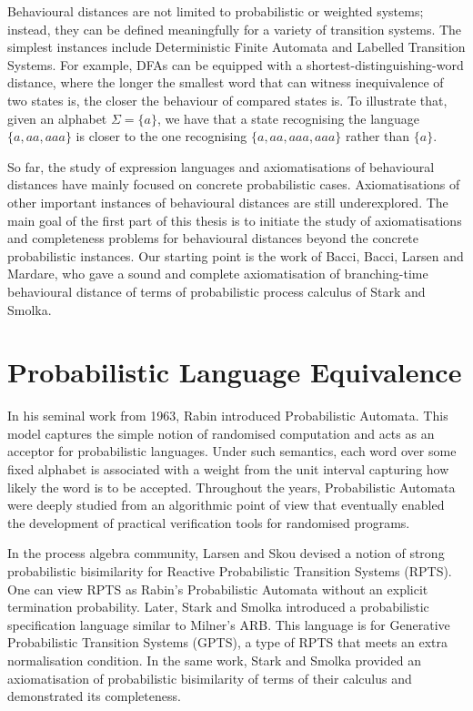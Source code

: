 Behavioural distances are not limited to probabilistic or weighted systems; instead, they can be defined meaningfully for a variety of transition systems. The simplest instances include Deterministic Finite Automata and Labelled Transition Systems. For example, DFAs can be equipped with a shortest-distinguishing-word distance, where the longer the smallest word that can witness inequivalence of two states is, the closer the behaviour of compared states is. To illustrate that, given an alphabet $\Sigma = \{a\}$, we have that a state recognising the language $\{a,aa, aaa\}$ is closer to the one recognising $\{a,aa,aaa,aaa\}$ rather than $\{a\}$. 

So far, the study of expression languages and axiomatisations of behavioural distances have mainly focused on concrete probabilistic cases. Axiomatisations of other important instances of behavioural distances are still underexplored. The main goal of the first part of this thesis is to initiate the study of axiomatisations and completeness problems for behavioural distances beyond the concrete probabilistic instances. Our starting point is the work of Bacci, Bacci, Larsen and Mardare, who gave a sound and complete axiomatisation of branching-time behavioural distance of terms of probabilistic process calculus of Stark and Smolka.

\section{Probabilistic Language Equivalence}
In his seminal work from 1963, Rabin introduced Probabilistic Automata. This model captures the simple notion of randomised computation and acts as an acceptor for probabilistic languages. Under such semantics, each word over some fixed alphabet is associated with a weight from the unit interval capturing how likely the word is to be accepted. Throughout the years, Probabilistic Automata were deeply studied from an algorithmic point of view that eventually enabled the development of practical verification tools for randomised programs. 

In the process algebra community, Larsen and Skou devised a notion of strong probabilistic bisimilarity for Reactive Probabilistic Transition Systems (RPTS). One can view RPTS as Rabin's Probabilistic Automata without an explicit termination probability. Later, Stark and Smolka introduced a probabilistic specification language similar to Milner's ARB. This language is for Generative Probabilistic Transition Systems (GPTS), a type of RPTS that meets an extra normalisation condition. In the same work, Stark and Smolka provided an axiomatisation of probabilistic bisimilarity of terms of their calculus and demonstrated its completeness. 

